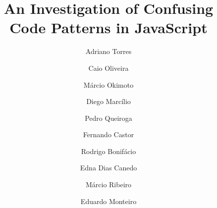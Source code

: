 \documentclass[preprint,12pt]{elsarticle}
\begin{document}
\begin{frontmatter}


\title{An Investigation of Confusing Code Patterns in JavaScript}

\author[1]{Adriano Torres}
\author[1]{Caio Oliveira}
\author[1]{M\'{a}rcio Okimoto}
\author[2]{Diego Marc\'{i}lio} 
\author[3]{Pedro Queiroga}
\author[4,5]{Fernando Castor}
\author[1]{Rodrigo Bonif\'{a}cio}
\author[1]{Edna Dias Canedo}
\author[5]{M\'{a}rcio Ribeiro}
\author[6]{Eduardo Monteiro}

\address[1]{Computer Science Department, University of Bras\'{i}lia, Brazil}
\address[2]{Universit\'{a} Della Svizzera Italiana, Switzerland}
\address[3]{Informatics Center, University Federal of Pernambuco, Brazil}
\address[4]{Information and Computing Sciences Department, Utrecht University, The Netherlands}
\address[5]{Institute of Computing, Federal University of Alagoas, Brazil}
\address[6]{Statistics Department, University of Bras\'{i}lia, Brazil}



\end{frontmatter}













{\small
 

}
\end{document}
